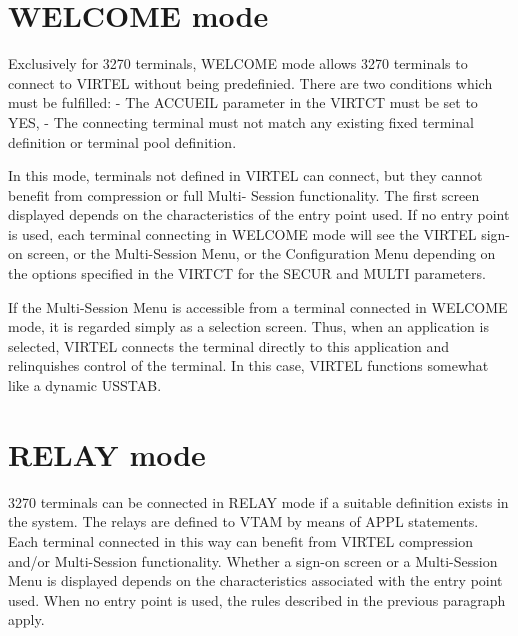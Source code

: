 \documentclass[letterpaper,10pt,english]{sphinxmanual}
\begin{document}

\section{WELCOME mode}
\label{\detokenize{connectivity_guide:index-136}}\label{\detokenize{connectivity_guide:welcome-mode}}
Exclusively for 3270 terminals, WELCOME mode allows 3270 terminals to connect to VIRTEL without being predefinied.
There are two conditions which must be fulfilled:
- The ACCUEIL parameter in the VIRTCT must be set to YES,
- The connecting terminal must not match any existing fixed terminal definition or terminal pool definition.

In this mode, terminals not defined in VIRTEL can connect, but they cannot benefit from compression or full Multi-
Session functionality. The first screen displayed depends on the characteristics of the entry point used. If no entry
point is used, each terminal connecting in WELCOME mode will see the VIRTEL sign-on screen, or the Multi-Session
Menu, or the Configuration Menu depending on the options specified in the VIRTCT for the SECUR and MULTI
parameters.

If the Multi-Session Menu is accessible from a terminal connected in WELCOME mode, it is regarded simply as a
selection screen. Thus, when an application is selected, VIRTEL connects the terminal directly to this application and
relinquishes control of the terminal. In this case, VIRTEL functions somewhat like a dynamic USSTAB.


\section{RELAY mode}
\label{\detokenize{connectivity_guide:index-137}}\label{\detokenize{connectivity_guide:relay-mode}}
3270 terminals can be connected in RELAY mode if a suitable definition exists in the system. The relays are defined to VTAM by means of APPL statements. Each terminal connected in this way can benefit from VIRTEL compression and/or Multi-Session functionality. Whether a sign-on screen or a Multi-Session Menu is displayed depends on the characteristics associated with the entry point used. When no entry point is used, the rules described in the previous paragraph apply.

\end{document}
